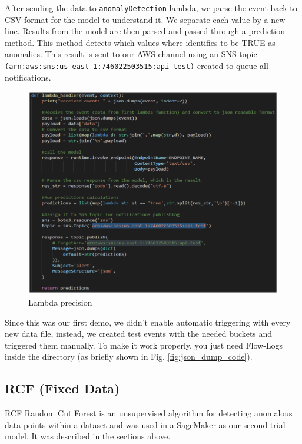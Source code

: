 After sending the data to \verb|anomalyDetection| lambda, we parse the event back to CSV format for the model to understand it. We separate each value by a new line. Results from the model are then parsed and passed through a prediction method. This method detects which values where identifies to be TRUE as anomalies. This result is sent to our AWS channel using an SNS topic \verb|(arn:aws:sns:us-east-1:746022503515:api-test)| created to queue all notifications.
\begin{figure}[h]
    \includegraphics[width=1\textwidth]{images/lambda-precistion.png}
    \caption{Lambda precision}
    \label{fig:lambda_precision}
\end{figure}
Since this was our first demo, we didn't enable automatic triggering with every new data file, instead, we created test events with the needed buckets and triggered them manually. To make it work properly, you just need Flow-Logs inside the directory (as briefly shown in Fig. \ref{fig:json_dump_code}). 
            

\subsection{RCF (Fixed Data)}
RCF Random Cut Forest is an unsupervised algorithm for detecting anomalous data points within a dataset and was used in a SageMaker as our second trial model. It was described in the sections above. \\

